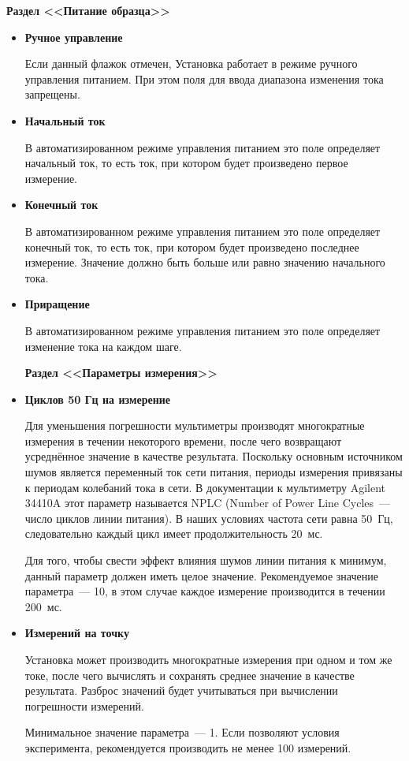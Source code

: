 \documentclass[12pt, a4paper, twocolumn]{report}
\newcommand{\PARAM}[1]{\item {\bf #1} }
\newcommand{\PARAMSECTION}[1]{\vbox{}{\bf Раздел <<#1>>}}
\begin{document}
\PARAMSECTION{Питание образца}

\begin{itemize}

\PARAM{Ручное управление}

Если данный флажок отмечен, Установка работает в режиме ручного управления питанием. При этом поля для ввода диапазона изменения тока запрещены.

\PARAM{Начальный ток}

В автоматизированном режиме управления питанием это поле определяет начальный ток, то есть ток, при котором будет произведено первое измерение.

\PARAM{Конечный ток}

В автоматизированном режиме управления питанием это поле определяет конечный ток, то есть ток, при котором будет произведено последнее измерение. Значение должно быть больше или равно значению начального тока.

\PARAM{Приращение}

В автоматизированном режиме управления питанием это поле определяет изменение тока на каждом шаге.

\PARAMSECTION{Параметры измерения}

\PARAM{Циклов 50 Гц на измерение}

Для уменьшения погрешности мультиметры производят многократные измерения в течении некоторого времени, после чего возвращают усреднённое значение в качестве результата. Поскольку основным источником шумов является переменный ток сети питания, периоды измерения привязаны к периодам колебаний тока в сети. В документации к мультиметру Agilent 34410A этот параметр называется NPLC (Number of Power Line Cycles~--- число циклов линии питания). В наших условиях частота сети равна 50~Гц, следовательно каждый цикл имеет продолжительность 20~мс.

Для того, чтобы свести эффект влияния шумов  линии питания к минимум, данный параметр должен иметь целое значение. Рекомендуемое значение параметра~--- 10, в этом случае каждое измерение производится в течении 200~мс.

\PARAM{Измерений на точку}

Установка может производить многократные измерения при одном и том же токе, после чего вычислять и сохранять среднее значение в качестве результата. Разброс значений будет учитываться при вычислении погрешности измерений.

Минимальное значение параметра~--- 1. Если позволяют условия эксперимента, рекомендуется производить не менее 100 измерений.


\end{itemize}
\end{document}
